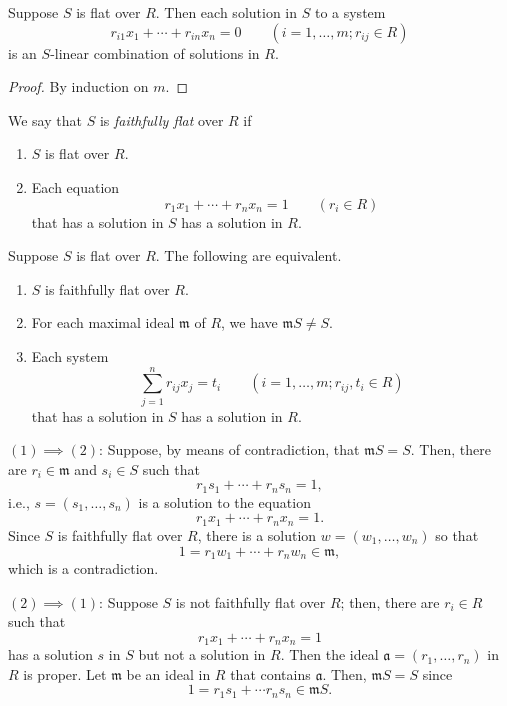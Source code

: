\begin{lemma} Suppose $S$ is flat over $R$.  Then each solution in $S$ to a system
$$r_{i1}x_1 + \cdots + r_{in}x_n=0 \qquad (i=1, \dots, m ; r_{ij}\in R)$$
is an $S$-linear combination of solutions in $R$. \end{lemma}

\begin{proof} By induction on $m$.  \end{proof}

\begin{definition} We say that $S$ is \textit{faithfully flat} over $R$ if
\begin{enumerate}%
\item $S$ is flat over $R$.
\item Each equation 
$$r_1x_1+\cdots +r_nx_n=1 \qquad (r_i\in R)$$
that has a solution in $S$ has a solution in $R$. \end{enumerate}
\end{definition}

\begin{lemma} Suppose $S$ is flat over $R$.  The following are equivalent.
\begin{enumerate}[(1)]
\item $S$ is faithfully flat over $R$.
\item For each maximal ideal $\mathfrak{m}$ of $R$, we have $\mathfrak{m}S\neq S$.
\item Each system 
\begin{equation} \sum_{j=1}^n r_{ij}x_j = t_i \qquad (i=1, \dots, m ; r_{ij}, t_i\in R) \tag{$*$} \end{equation}
that has a solution in $S$ has a solution in $R$. 
\end{enumerate} \end{lemma}

$(1)\implies(2)$: Suppose, by means of contradiction, that $\mathfrak{m}S=S$.  Then, there are $r_i\in \mathfrak{m}$ and $s_i\in S$ such that
$$r_1s_1+\cdots + r_n s_n = 1,$$
i.e., $s=(s_1, \dots, s_n)$ is a solution to the equation
$$r_1x_1 + \cdots + r_n x_n = 1.$$
Since $S$ is faithfully flat over $R$, there is a solution $w=(w_1, \dots, w_n)$ so that
$$1= r_1w_1+\cdots + r_n w_n \in \mathfrak{m},$$
which is a contradiction. 

$(2)\implies (1)$:  Suppose $S$ is not faithfully flat over $R$; then, there are $r_i\in R$ such that
$$r_1x_1+\cdots + r_n x_n=1$$
has a solution $s$ in $S$ but not a solution in $R$.  Then the ideal $\mathfrak{a}=(r_1, \dots, r_n)$ in $R$ is proper.  Let $\mathfrak{m}$ be an ideal in $R$ that contains $\mathfrak{a}$. Then, $\mathfrak{m}S=S$ since
$$1=r_1s_1+\cdots r_n s_n \in \mathfrak{m}S.$$


